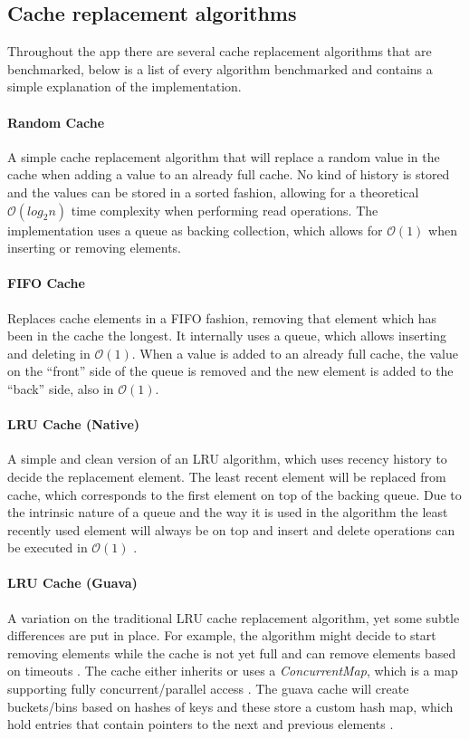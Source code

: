\documentclass[pdftex,a4paper,12pt,twoside]{report}
\begin{document}
\subsection{Cache replacement algorithms}
\label{sec:cache_algorithms_benchmark}

Throughout the app there are several cache replacement algorithms that are benchmarked, below is a list of every algorithm benchmarked and contains a simple explanation of the implementation.
\paragraph{Random Cache} A simple cache replacement algorithm that will replace a random value in the cache when adding a value to an already full cache. No kind of history is stored and the values can be stored in a sorted fashion, allowing for a theoretical $\mathcal{O}(log_2n)$ time complexity when performing read operations. The implementation uses a queue as backing collection, which allows for $\mathcal{O}(1)$ when inserting or removing elements.
\paragraph{FIFO Cache} Replaces cache elements in a FIFO fashion, removing that element which has been in the cache the longest. It internally uses a queue, which allows inserting and deleting in $\mathcal{O}(1)$. When a value is added to an already full cache, the value on the ``front'' side of the queue is removed and the new element is added to the ``back'' side, also in $\mathcal{O}(1)$.
\paragraph{LRU Cache (Native)} A simple and clean version of an LRU algorithm, which uses recency history to decide the replacement element. The least recent element will be replaced from cache, which corresponds to the first element on top of the backing queue. Due to the intrinsic nature of a queue and the way it is used in the algorithm the least recently used element will always be on top and insert and delete operations can be executed in $\mathcal{O}(1)$ \citep{lru_cache_native}.
\paragraph{LRU Cache (Guava)} A variation on the traditional LRU cache replacement algorithm, yet some subtle differences are put in place. For example, the algorithm might decide to start removing elements while the cache is not yet full and can remove elements based on timeouts \citep{guava_cachesexplained}. The cache either inherits or uses a \emph{ConcurrentMap}, which is a map supporting fully concurrent/parallel access \citep{oracle_concurrentmap}. The guava cache will create buckets/bins based on hashes of keys and these store a custom hash map, which hold entries that contain pointers to the next and previous elements \citep{guava_localcache}.
\end{document}
